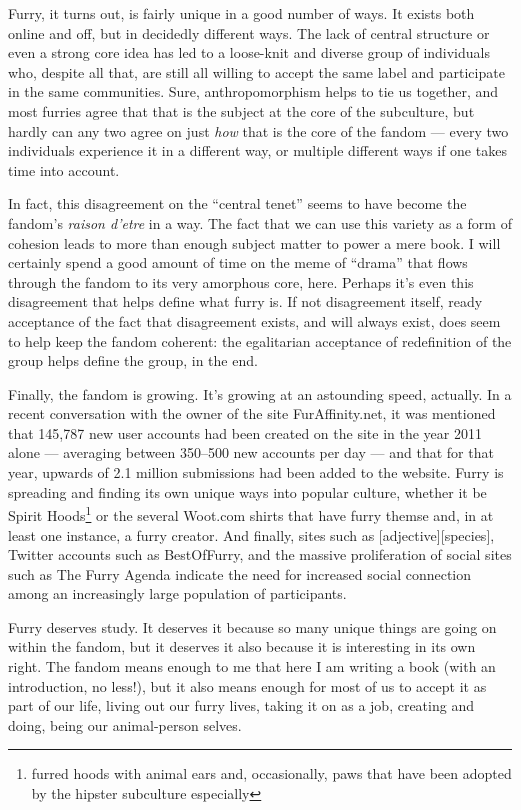 Furry, it turns out, is fairly unique in a good number of ways. It exists both online and off, but in decidedly different ways. The lack of central structure or even a strong core idea has led to a loose-knit and diverse group of individuals who, despite all that, are still all willing to accept the same label and participate in the same communities. Sure, anthropomorphism helps to tie us together, and most furries agree that that is the subject at the core of the subculture, but hardly can any two agree on just \emph{how} that is the core of the fandom --- every two individuals experience it in a different way, or multiple different ways if one takes time into account.

In fact, this disagreement on the ``central tenet'' seems to have become the fandom's \emph{raison d'etre} in a way. The fact that we can use this variety as a form of cohesion leads to more than enough subject matter to power a mere book. I will certainly spend a good amount of time on the meme of ``drama'' that flows through the fandom to its very amorphous core, here. Perhaps it's even this disagreement that helps define what furry is. If not disagreement itself, ready acceptance of the fact that disagreement exists, and will always exist, does seem to help keep the fandom coherent: the egalitarian acceptance of redefinition of the group helps define the group, in the end.

Finally, the fandom is growing. It's growing at an astounding speed, actually. In a recent conversation with the owner of the site FurAffinity.net, it was mentioned that 145,787 new user accounts had been created on the site in the year 2011 alone --- averaging between 350--500 new accounts per day --- and that for that year, upwards of 2.1 million submissions had been added to the website. Furry is spreading and finding its own unique ways into popular culture, whether it be Spirit Hoods\footnote{furred hoods with animal ears and, occasionally, paws that have been adopted by the hipster subculture especially} or the several Woot.com shirts that have furry themse and, in at least one instance, a furry creator. And finally, sites such as {[}adjective{]}{[}species{]}, Twitter accounts such as BestOfFurry, and the massive proliferation of social sites such as The Furry Agenda indicate the need for increased social connection among an increasingly large population of participants.

Furry deserves study. It deserves it because so many unique things are going on within the fandom, but it deserves it also because it is interesting in its own right. The fandom means enough to me that here I am writing a book (with an introduction, no less!), but it also means enough for most of us to accept it as part of our life, living out our furry lives, taking it on as a job, creating and doing, being our animal-person selves.
